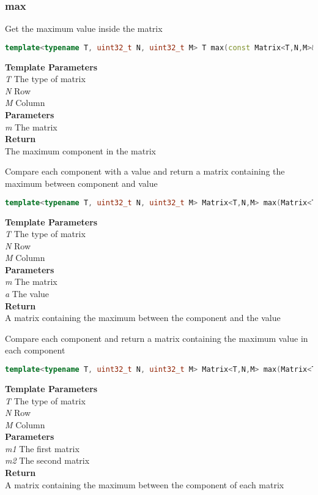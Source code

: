 \subsubsection{max}
\begin{mdframed}
Get the maximum value inside the matrix
\begin{lstlisting}[language=C++]
template<typename T, uint32_t N, uint32_t M> T max(const Matrix<T,N,M>& m) 
\end{lstlisting}
\textbf{Template Parameters} \\ 
\textit{T} The type of matrix \\ 
\textit{N} Row \\ 
\textit{M} Column \\ 
\textbf{Parameters} \\ 
\textit{m} The matrix \\ 
\textbf{Return} \\ 
The maximum component in the matrix\\ 
\end{mdframed}

\begin{mdframed}
Compare each component with a value and return a matrix containing the maximum between component and value
\begin{lstlisting}[language=C++]
template<typename T, uint32_t N, uint32_t M> Matrix<T,N,M> max(Matrix<T,N,M> m, T a) 
\end{lstlisting}
\textbf{Template Parameters} \\ 
\textit{T} The type of matrix \\ 
\textit{N} Row \\ 
\textit{M} Column \\ 
\textbf{Parameters} \\ 
\textit{m} The matrix \\ 
\textit{a} The value \\ 
\textbf{Return} \\ 
A matrix containing the maximum between the component and the value\\ 
\end{mdframed}

\begin{mdframed}
Compare each component and return a matrix containing the maximum value in each component
\begin{lstlisting}[language=C++]
template<typename T, uint32_t N, uint32_t M> Matrix<T,N,M> max(Matrix<T,N,M> m1, const Matrix<T,N,M>& m2) 
\end{lstlisting}
\textbf{Template Parameters} \\ 
\textit{T} The type of matrix \\ 
\textit{N} Row \\ 
\textit{M} Column \\ 
\textbf{Parameters} \\ 
\textit{m1} The first matrix \\ 
\textit{m2} The second matrix \\ 
\textbf{Return} \\ 
A matrix containing the maximum between the component of each matrix\\ 
\end{mdframed}

